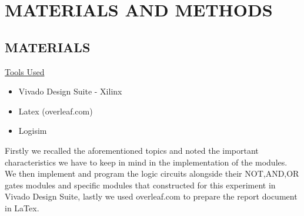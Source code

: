 \documentclass[pdftex,12pt,a4paper]{article}
\begin{document}
\section{MATERIALS AND METHODS}

\subsection{MATERIALS}
\underline{Tools Used}
\begin{itemize}
    \item {Vivado Design Suite - Xilinx}
    \item{Latex (overleaf.com)}
    \item{Logisim}
\end{itemize}
Firstly we recalled the aforementioned topics and noted the important characteristics we have to keep in mind in the implementation of the modules. We then implement and program the logic circuits alongside their NOT,AND,OR gates modules and specific modules that constructed for this experiment in Vivado Design Suite, lastly we used overleaf.com to prepare the report document in LaTex.
\end{document}
